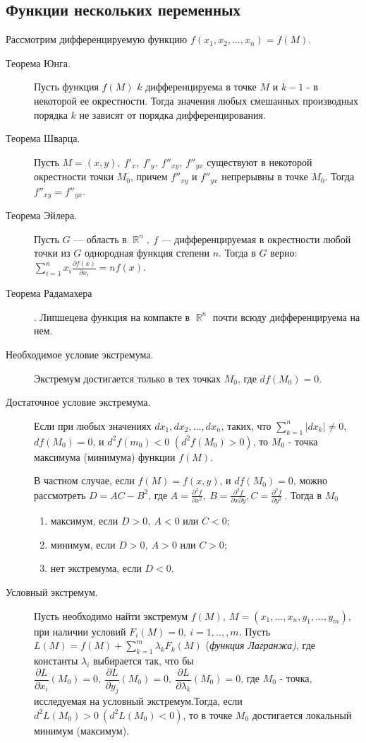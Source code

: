 \documentclass[a4paper,12pt]{scrartcl}
\DeclareMathOperator{\bbr}{\mathbb{R}}
\begin{document}
\subsection{Функции нескольких переменных}

Рассмотрим дифференцируемую функцию $f(x_1,x_2,...,x_n) = f(M)$.

\begin{description}
\item[Теорема Юнга.] Пусть функция $f(M)$ $k$ дифференцируема в точке $M$ и $k-1$ - в некоторой ее окрестности. Тогда значения любых смешанных производных порядка $k$ не зависят от порядка дифференцирования.
\item[Теорема Шварца.] Пусть $M=(x,y),\ f'_x,\ f'_y,\ f''_{xy},\ f''_{yx}$ существуют в некоторой окрестности точки $M_0$, причем $f''_{xy}$ и $ f''_{yx}$ непрерывны в точке $M_0$. Тогда $f''_{xy} = f''_{yx}$.
\item[Теорема Эйлера.] Пусть $G$ --- область в $\bbr^n,\ f$ --- дифференцируемая в окрестности любой точки из $G$ однородная функция степени $n$. Тогда в $G$ верно: $\sum\limits_{i=1}^{n}x_i\frac{\partial f(x)}{\partial x_i} = nf(x)$.
\item[Теорема Радамахера]. Липшецева функция на компакте в $\bbr^n$ почти всюду дифференцируема на нем. 
 \item[Необходимое условие экстремума.] Экстремум достигается только в тех точках $M_0$, где $df(M_0) = 0$.
 \item[Достаточное условие экстремума.] Если при любых значениях $dx_1,dx_2,...,dx_n$, таких, что $\sum\limits_{k=1}^{n}|dx_k| \neq 0$, $df(M_0) = 0$, и $d^2f(m_0) < 0$ $(d^2f(M_0) > 0)$, то $M_0$ - точка максимума (минимума) функции $f(M)$.

В частном случае, если $f(M) = f(x,y)$, и $df(M_0)=0$, можно рассмотреть $D = AC-B^2$, где $A = \frac{\partial^2 f }{\partial x^2},\ B = \frac{\partial^2 f }{\partial x \partial y}, C = \frac{\partial^2 f }{\partial y^2}\ $. Тогда в $M_0$
\begin{enumerate}
 \item максимум, если $D > 0,\ A < 0$ или $C<0$;
 \item минимум, если $D > 0,\ A > 0$ или $C>0$;
 \item нет экстремума, если $D < 0$.
\end{enumerate}

 \item[Условный экстремум.] Пусть необходимо найти экстремум $f(M),\ M=(x_1,...,x_n,y_1,...,y_m)$, при наличии условий $F_i(M) = 0,\ i=1,..,,m$. Пусть $L(M) = f(M) + \sum\limits_{k=1}^{m}\lambda_kF_k(M)$ (\textit{функция Лагранжа)}, где константы $\lambda_i$ выбирается так, что бы $\dfrac{\partial L}{\partial x_i}(M_0)= 0,\ \dfrac{\partial L}{\partial y_j}(M_0)= 0,\ \dfrac{\partial L}{\partial \lambda_k}(M_0)= 0$, где $M_0$ - точка, исследуемая на условный экстремум.Тогда, если $d^2L(M_0) > 0 \ (d^2L(M_0) < 0)$, то в точке $M_0$ достигается локальный минимум (максимум).
\end{description}
\end{document}
